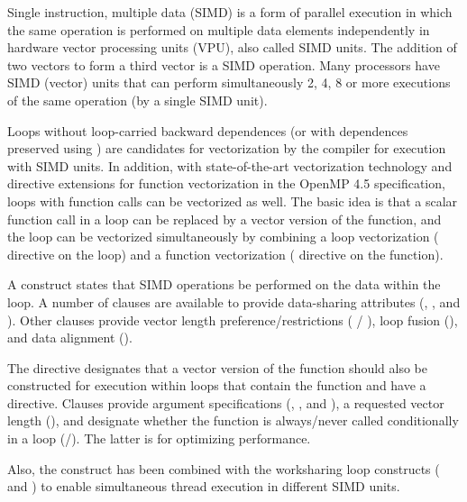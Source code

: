 \label{chap:simd}

Single instruction, multiple data (SIMD) is a form of parallel execution 
in which the same operation is performed on multiple data elements 
independently in hardware vector processing units (VPU), also called SIMD units.
The addition of two vectors to form a third vector is a SIMD operation.
Many processors have SIMD (vector) units that can perform simultaneously 
2, 4, 8 or more executions of the same operation (by a single SIMD unit). 

Loops without loop-carried backward dependences (or with dependences preserved using
) are candidates for vectorization by the compiler for 
execution with SIMD units. In addition, with state-of-the-art vectorization 
technology and  directive extensions for function vectorization
in the OpenMP 4.5 specification, loops with function calls can be vectorized as well. 
The basic idea is that a scalar function call in a loop can be replaced by a vector version 
of the function, and the loop can be vectorized simultaneously by combining a loop 
vectorization ( directive on the loop) and a function 
vectorization ( directive on the function).

A  construct states that SIMD operations be performed on the
data within the loop.  A number of clauses are available to provide
data-sharing attributes (, ,  and 
).  Other clauses provide vector length preference/restrictions 
( / ), loop fusion (), and data 
alignment ().

The  directive designates
that a vector version of the function should also be constructed for 
execution within loops that contain the function and have a  
directive.  Clauses provide argument specifications (,
, and ), a requested vector length 
(), and designate whether the function is always/never 
called conditionally in a loop (/). 
The latter is for optimizing performance.

Also, the  construct has been combined with the worksharing loop 
constructs ( and ) to enable simultaneous thread 
execution in different SIMD units.  






